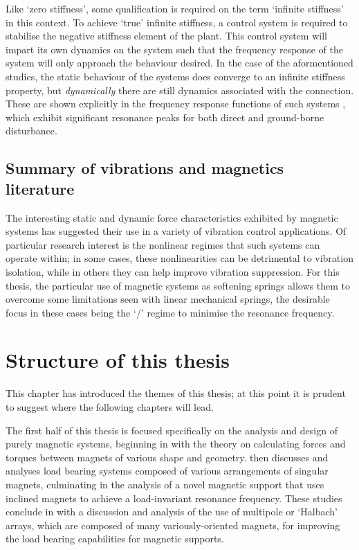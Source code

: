 \documentclass[11pt,a4paper]{memoir}
\begin{document}
Like `zero stiffness', some qualification is required on the term `infinite stiffness' in this context.
To achieve `true' infinite stiffness, a control system is required to stabilise the negative stiffness element of the plant.
This control system will impart its own dynamics on the system such that the frequency response of the system will only approach the behaviour desired.
In the case of the aformentioned studies, the static behaviour of the systems does converge to an infinite stiffness property, but \emph{dynamically} there are still dynamics associated with the connection.
These are shown explicitly in the frequency response functions of such systems \parencite{mizuno2010-jvc}, which exhibit significant resonance peaks for both direct and ground-borne disturbance.

\subsection{Summary of vibrations and magnetics literature}

The interesting static and dynamic force characteristics exhibited by magnetic systems has suggested their use in a variety of vibration control applications.
Of particular research interest is the nonlinear regimes that such systems can operate within; in some cases, these nonlinearities can be detrimental to vibration isolation, while in others they can help improve vibration suppression.
For this thesis, the particular use of magnetic systems as softening springs allows them to overcome some limitations seen with linear mechanical springs, the desirable focus in these cases being the `\qzs/' regime to minimise the resonance frequency.

\section{Structure of this thesis}

This chapter has introduced the themes of this thesis; at this point it is prudent to suggest where the following chapters will lead.

The first half of this thesis is focused specifically on the analysis and design of purely magnetic systems, beginning in  with the theory on calculating forces and torques between magnets of various shape and geometry.
 then discusses and analyses load bearing systems composed of various arrangements of singular magnets, culminating in the analysis of a novel magnetic support that uses inclined magnets to achieve a load-invariant resonance frequency.
These studies conclude in  with a discussion and analysis of the use of multipole or `Halbach' arrays, which are composed of many variously-oriented magnets, for improving the load bearing capabilities for magnetic supports.
\end{document}
